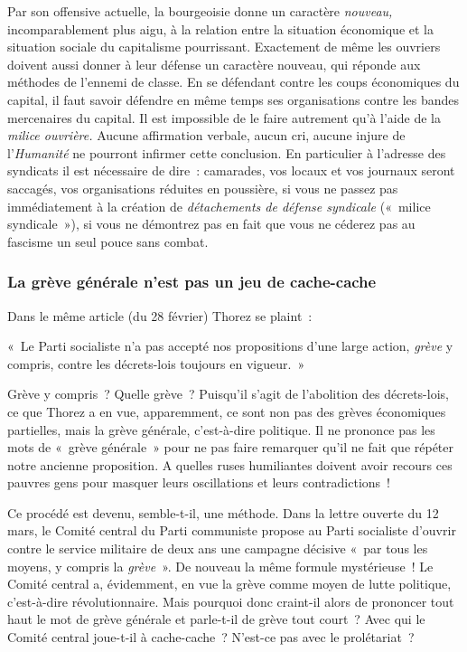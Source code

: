 \documentclass[french,twoside]{book} %
\newenvironment{quoteblock}%
  {\begin{quoting}}
  {\end{quoting}}
\newenvironment{quotebar}{%
    \def\FrameCommand{{\color{rubric!10!}\vrule width 0.5em} \hspace{0.9em}}%
    \def\OuterFrameSep{\itemsep} %
    \MakeFramed {\advance\hsize-\width \FrameRestore}
  }%
  {%
    \endMakeFramed
  }
\renewenvironment{quoteblock}%
  {%
    \savenotes
    \setstretch{0.9}
    \normalfont
    \begin{quotebar}
  }
  {%
    \end{quotebar}
    \spewnotes
  }
\begin{document}
Par son offensive actuelle, la bourgeoisie donne un caractère \emph{nouveau,} incomparablement plus aigu, à la relation entre la situation économique et la situation sociale du capitalisme pourrissant. Exactement de même les ouvriers doivent aussi donner à leur défense un caractère nouveau, qui réponde aux méthodes de l’ennemi de classe. En se défendant contre les coups économiques du capital, il faut savoir défendre en même temps ses organisations contre les bandes mercenaires du capital. Il est impossible de le faire autrement qu’à l’aide de la \emph{milice ouvrière.} Aucune affirmation verbale, aucun cri, aucune injure de l’\emph{Humanité} ne pourront infirmer cette conclusion. En particulier à l’adresse des syndicats il est nécessaire de dire : camarades, vos locaux et vos journaux seront saccagés, vos organisations réduites en poussière, si vous ne passez pas immédiatement à la création de \emph{détachements de défense syndicale} (« milice syndicale »), si  vous ne démontrez pas en fait que vous ne céderez pas au fascisme un seul pouce sans combat.
\subsubsection[{La grève générale n’est pas un jeu de cache-cache}]{La grève générale n’est pas un jeu de cache-cache}
\noindent Dans le même article (du 28 février) Thorez se plaint :\par

\begin{quoteblock}
 \noindent « Le Parti socialiste n’a pas accepté nos propositions d’une large action, \emph{grève} y compris, contre les décrets-lois toujours en vigueur. »
 \end{quoteblock}

\noindent Grève y compris ? Quelle grève ? Puisqu’il s’agit de l’abolition des décrets-lois, ce que Thorez a en vue, apparemment, ce sont non pas des grèves économiques partielles, mais la grève générale, c’est-à-dire politique. Il ne prononce pas les mots de « grève générale » pour ne pas faire remarquer qu’il ne fait que répéter notre ancienne proposition. A quelles ruses humiliantes doivent avoir recours ces pauvres gens pour masquer leurs oscillations et leurs contradictions !\par
Ce procédé est devenu, semble-t-il, une méthode. Dans la lettre ouverte du 12 mars, le Comité central du Parti communiste propose au Parti socialiste d’ouvrir contre le service militaire de deux ans une campagne décisive « par tous les moyens, y compris la \emph{grève} ». De nouveau la même formule mystérieuse ! Le Comité central a, évidemment, en vue la grève comme moyen de lutte politique, c’est-à-dire révolutionnaire. Mais pourquoi donc craint-il alors de prononcer tout haut le mot de grève générale et parle-t-il de grève tout court ? Avec qui le Comité central joue-t-il à cache-cache ? N’est-ce pas avec le prolétariat ?
\end{document}
